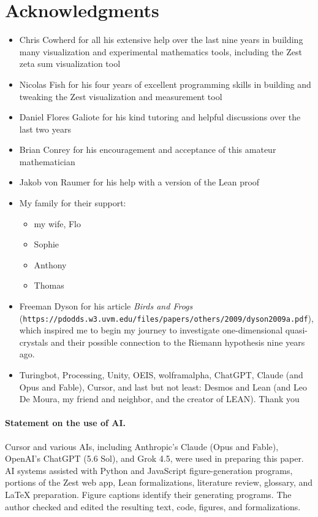 \documentclass[11pt]{article}
\theoremstyle{definition}
\begin{document}
\clearpage

\section*{Acknowledgments}
\begin{itemize}
  \item Chris Cowherd for all his extensive help over the last nine years in building many visualization and experimental mathematics tools, including the Zest zeta sum visualization tool
  \item Nicolas Fish for his four years of excellent programming skills in building and tweaking the Zest visualization and measurement tool
  \item Daniel Flores Galiote for his kind tutoring and helpful discussions over the last two years
  \item Brian Conrey for his encouragement and acceptance of this amateur mathematician
  \item Jakob von Raumer for his help with a version of the Lean proof
  \item My family for their support:
    \begin{itemize}
      \item my wife, Flo
      \item Sophie
      \item Anthony
      \item Thomas
    \end{itemize}
  \item Freeman Dyson for his article {\it Birds and Frogs} \\(\texttt {\small https://pdodds.w3.uvm.edu/files/papers/others/2009/dyson2009a.pdf}), which inspired me to begin my journey to investigate one-dimensional quasi-crystals and their possible connection to the Riemann hypothesis nine years ago.
  \item Turingbot, Processing, Unity, OEIS, wolframalpha, ChatGPT, Claude (and Opus and Fable), Cursor, and last but not least: Desmos and Lean (and Leo De Moura, my friend and neighbor, and the creator of LEAN).  Thank you
\end{itemize}

\paragraph{Statement on the use of AI.}
Cursor and various AIs, including Anthropic's Claude (Opus and Fable),
OpenAI's ChatGPT (5.6 Sol), and Grok 4.5, were used in preparing this
paper. AI systems assisted with Python and JavaScript figure-generation
programs, portions of the Zest web app, Lean formalizations, literature
review, glossary, and \LaTeX{} preparation. Figure captions identify their
generating programs. The author checked and edited the resulting text, code,
figures, and formalizations.
\end{document}
